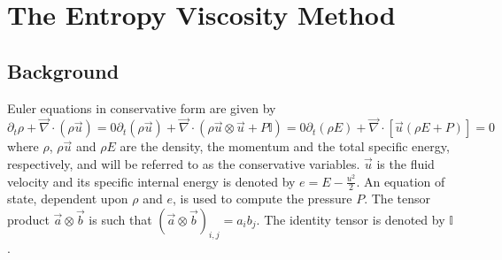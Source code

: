 \documentclass[preprint,10pt]{elsarticle}
\renewcommand{\div}{\vec{\nabla}\! \cdot \!}
\begin{document}
\section{The Entropy Viscosity Method} \label{sec:entro_visc}

\subsection{Background} \label{sec:background}

Euler equations in conservative form are given by
\begin{subequations}
\label{eq:euler_eq}
%
\begin{equation}
\partial_t \rho  + \div \left( \rho \vec{u} \right) = 0
\end{equation}
%
\begin{equation}
\partial_t \left( \rho \vec{u} \right) + \div \left( \rho \vec{u} \otimes \vec{u} + P \mathbb{I} \right) = 0 
\end{equation}
%
\begin{equation}
\partial_t \left( \rho E \right) + \div \left[ \vec{u} \left( \rho E + P \right) \right] = 0
\end{equation}
\end{subequations}
%
where $\rho$, $\rho \vec{u}$ and $\rho E$ are the density, the momentum and the total specific energy, 
respectively, and will be referred to as the conservative variables. $\vec{u}$ is the fluid velocity and 
its specific internal energy is denoted by $e=E-\tfrac{u^2}{2}$. An equation of state, dependent upon 
$\rho$ and $e$, is used to compute the pressure $P$. The tensor product $\vec{a} \otimes \vec{b}$ is 
such that $(\vec{a} \otimes \vec{b})_{i,j} = a_i b_j$. The identity tensor is denoted by $\mathbb{I}$.
\end{document}
